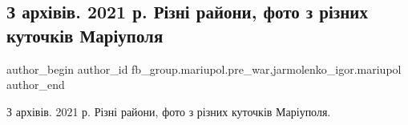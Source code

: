  
 
 
 
 

\subsection{З архівів. 2021 р. Різні райони, фото з різних куточків Маріуполя}
\label{sec:15_02_2023.fb.fb_group.mariupol.pre_war.5.z_arkh_v_v__2021_r__}
 
\ifcmt
 author_begin
   author_id fb_group.mariupol.pre_war,jarmolenko_igor.mariupol
 author_end
\fi

З архівів. 2021 р. Різні райони, фото з різних куточків Маріуполя.
